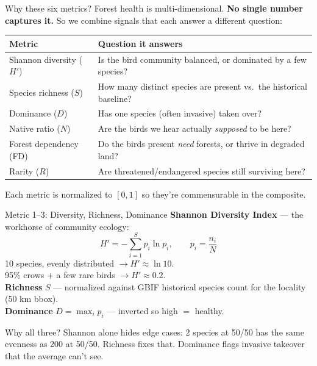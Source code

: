\documentclass[aspectratio=169]{beamer}
\begin{document}
\begin{frame}{Why these six metrics?}
  Forest health is multi-dimensional. \textbf{No single number captures it.} So we combine signals that each answer a different question:
  \vspace{0.3em}
  \small
  \begin{tabular}{p{3.8cm}p{10cm}}
    \toprule
    \textbf{Metric} & \textbf{Question it answers} \\
    \midrule
    Shannon diversity ($H'$) & Is the bird community balanced, or dominated by a few species? \\
    Species richness ($S$)   & How many distinct species are present vs.\ the historical baseline? \\
    Dominance ($D$)          & Has one species (often invasive) taken over? \\
    Native ratio ($N$)       & Are the birds we hear actually \emph{supposed} to be here? \\
    Forest dependency (FD)   & Do the birds present \emph{need} forests, or thrive in degraded land? \\
    Rarity ($R$)             & Are threatened/endangered species still surviving here? \\
    \bottomrule
  \end{tabular}
  \vspace{0.4em}
  \footnotesize Each metric is normalized to $[0,1]$ so they're commensurable in the composite.
\end{frame}

\begin{frame}{Metric 1--3: Diversity, Richness, Dominance}
  \textbf{Shannon Diversity Index} --- the workhorse of community ecology:
  \[
    H' = -\sum_{i=1}^{S} p_i \ln p_i, \qquad p_i = \frac{n_i}{N}
  \]
  10 species, evenly distributed $\rightarrow H' \approx \ln 10$. \\
  95\% crows + a few rare birds $\rightarrow H' \approx 0.2$. \\[0.4em]

  \textbf{Richness} $S$ --- normalized against GBIF historical species count for the locality (50 km bbox). \\[0.4em]

  \textbf{Dominance} $D = \max_i p_i$ --- inverted so high $= $ healthy. \\[0.4em]

  \begin{alertblock}{Why all three?}
    Shannon alone hides edge cases: 2 species at 50/50 has the same evenness as 200 at 50/50. Richness fixes that. Dominance flags invasive takeover that the average can't see.
  \end{alertblock}
\end{frame}
\end{document}
